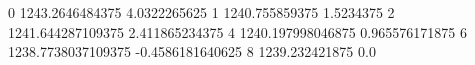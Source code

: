 0 1243.2646484375 4.0322265625
1 1240.755859375 1.5234375
2 1241.644287109375 2.411865234375
4 1240.197998046875 0.965576171875
6 1238.7738037109375 -0.4586181640625
8 1239.232421875 0.0

